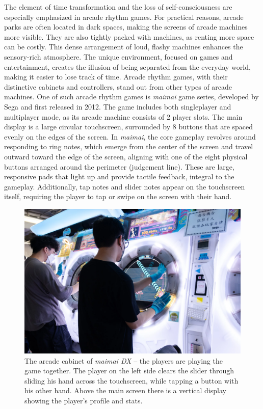 The element of time transformation and the loss of self-consciousness are especially emphasized in arcade rhythm games. For practical reasons, arcade parks are often located in dark spaces, making the screens of arcade machines more visible. They are also tightly packed with machines, as renting more space can be costly. This dense arrangement of loud, flashy machines enhances the sensory-rich atmosphere. The unique environment, focused on games and entertainment, creates the illusion of being separated from the everyday world, making it easier to lose track of time. Arcade rhythm games, with their distinctive cabinets and controllers, stand out from other types of arcade machines. One of such arcade rhythm games is \textit{maimai} game series, developed by Sega and first released in 2012. The game includes both singleplayer and multiplayer mode, as its arcade machine consists of 2 player slots. The main display is a large circular touchscreen, surrounded by 8 buttons that are spaced evenly on the edges of the screen. In \textit{maimai}, the core gameplay revolves around responding to ring notes, which emerge from the center of the screen and travel outward toward the edge of the screen, aligning with one of the eight physical buttons arranged around the perimeter (judgement line). These are large, responsive pads that light up and provide tactile feedback, integral to the gameplay. Additionally, tap notes and slider notes appear on the touchscreen itself, requiring the player to tap or swipe on the screen with their hand. 

\begin{figure}[h]
    \centering\includegraphics[scale=0.4]{obrazki/maimai2.png}
    \caption{The arcade cabinet of \textit{maimai DX} -- the players are playing the game together. The player on the left side clears the slider through sliding his hand across the touchscreen, while tapping a button with his other hand. Above the main screen there is a vertical display showing the player's profile and stats.\cite{maimai1}}
    \label{fig:maimaicabinet}
\end{figure}

